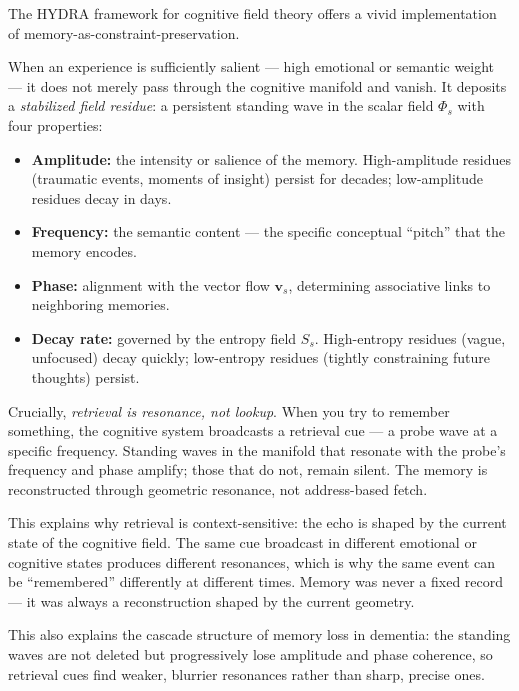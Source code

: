 \begin{tcolorbox}[enhanced, breakable,
  colback=RSVPlight, colframe=RSVPmid, arc=4pt, boxrule=0.6pt,
  title={\bfseries\sffamily Illustration: Memory as Stabilized Field Residue},
  coltitle=white, attach boxed title to top left={yshift=-2mm,xshift=6mm},
  boxed title style={colback=RSVPmid,sharp corners},
  top=4mm,left=4mm,right=4mm,bottom=4mm]

The HYDRA framework for cognitive field theory offers a vivid
implementation of memory-as-constraint-preservation.

When an experience is sufficiently salient — high emotional or semantic
weight — it does not merely pass through the cognitive manifold and vanish.
It deposits a \emph{stabilized field residue}: a persistent standing wave
in the scalar field $\Phi_s$ with four properties:

\begin{itemize}
  \item \textbf{Amplitude:} the intensity or salience of the memory.
        High-amplitude residues (traumatic events, moments of insight)
        persist for decades; low-amplitude residues decay in days.
  \item \textbf{Frequency:} the semantic content — the specific
        conceptual ``pitch'' that the memory encodes.
  \item \textbf{Phase:} alignment with the vector flow $\mathbf{v}_s$,
        determining associative links to neighboring memories.
  \item \textbf{Decay rate:} governed by the entropy field $S_s$.
        High-entropy residues (vague, unfocused) decay quickly;
        low-entropy residues (tightly constraining future thoughts)
        persist.
\end{itemize}

Crucially, \emph{retrieval is resonance, not lookup}. When you try to
remember something, the cognitive system broadcasts a retrieval cue — a
probe wave at a specific frequency. Standing waves in the manifold that
resonate with the probe's frequency and phase amplify; those that do not,
remain silent. The memory is reconstructed through geometric resonance,
not address-based fetch.

This explains why retrieval is context-sensitive: the echo is shaped by
the current state of the cognitive field. The same cue broadcast in
different emotional or cognitive states produces different resonances,
which is why the same event can be ``remembered'' differently at different
times. Memory was never a fixed record — it was always a reconstruction
shaped by the current geometry.

This also explains the cascade structure of memory loss in dementia:
the standing waves are not deleted but progressively lose amplitude and
phase coherence, so retrieval cues find weaker, blurrier resonances rather
than sharp, precise ones.
\end{tcolorbox}


